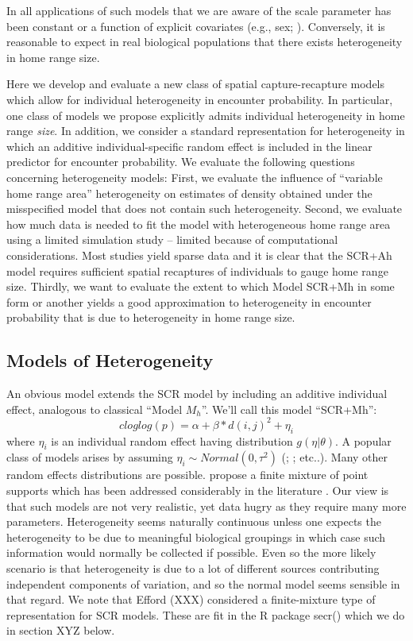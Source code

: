 In all applications of such models that we are aware of the scale parameter has been constant or a function of explicit covariates (e.g., sex; \citet{gardner_etal:2010}). Conversely, it is reasonable to expect in real biological populations that there exists heterogeneity in home range size.
  
Here we develop and evaluate a new class of spatial capture-recapture models which allow for individual heterogeneity in encounter probability.  In particular, one class of models we propose explicitly admits individual heterogeneity in home range {\it   size}. In addition, we consider a standard representation for heterogeneity in which an additive individual-specific random effect is included in the linear predictor for encounter probability.
We evaluate the following questions concerning heterogeneity models: First, we evaluate the influence of ``variable home range area'' heterogeneity on estimates of density obtained under the misspecified model that does not contain such heterogeneity.  Second, we evaluate how much data is needed to fit the model with heterogeneous home range area using a limited simulation study -- limited because of
computational considerations.  Most studies yield sparse data and it is clear that the SCR+Ah model requires sufficient spatial recaptures of individuals to gauge home range size.  Thirdly, we want to evaluate the extent to which Model SCR+Mh in some form or another yields a good approximation to heterogeneity in encounter probability that is due to heterogeneity in home range size.

\subsection{Models of Heterogeneity}

An obvious model extends the SCR model by including an additive individual effect, analogous to classical ``Model $M_{h}$''. We'll call this model ``SCR+Mh'': 
\[  
 cloglog(p) = \alpha + \beta*d(i,j)^2  + \eta_{i}
\]
where $\eta_{i}$ is an individual random effect having distribution
$g(\eta|\theta)$.  A popular class of models arises by assuming
$\eta_{i} \sim Normal(0,\tau^{2})$ (\citet{coull_agresti:1999};
\citet{dorazio_royle:2003}; etc..).  Many other random effects
distributions are possible. \citet{norris_pollock:1996} propose a
finite mixture of point supports which has been addressed considerably
in the literature \citep{pledger:2003; dorazio_royle:2003; link:2003}.  Our view is that such models are not very realistic, yet data hugry as they require many more parameters. Heterogeneity seems naturally continuous unless one expects the heterogeneity to be due to meaningful biological groupings in which case such information would normally be collected if possible.  Even so the more likely scenario is that heterogeneity is due to a lot of different sources contributing independent components of variation, and so the normal model seems sensible in that regard. We note that Efford (XXX) considered a finite-mixture type of representation for SCR models. These are fit in the R package secr() which we do in section XYZ below. 

